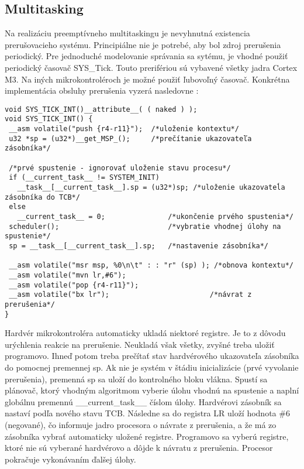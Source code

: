 \subsection{Multitasking}

Na realizáciu preemptívneho multitaskingu je nevyhnutná existencia prerušovacieho systému. Principiálne nie je potrebé, aby bol zdroj prerušenia periodický. Pre jednoduché modelovanie správania sa sytému, je vhodné použiť periodický časovač SYS\_Tick. Touto prerifériou sú vybavené všetky jadra Cortex M3. Na iných mikrokontroléroch je možné použiť ľubovoľný časovač. Konkrétna implementácia obsluhy prerušenia vyzerá nasledovne :

{\small
\begin{verbatim}
void SYS_TICK_INT()__attribute__( ( naked ) ); 
void SYS_TICK_INT() {
 __asm volatile("push {r4-r11}");  /*uloženie kontextu*/
 u32 *sp = (u32*)__get_MSP_();     /*prečítanie ukazovateľa zásobníka*/

 /*prvé spustenie - ignorovať uloženie stavu procesu*/
 if (__current_task__ != SYSTEM_INIT)  
   __task__[__current_task__].sp = (u32*)sp; /*uloženie ukazovateĺa zásobníka do TCB*/
 else
   __current_task__ = 0;               /*ukončenie prvého spustenia*/
 scheduler();                          /*vybratie vhodnej úlohy na spustenie*/
 sp = __task__[__current_task__].sp;   /*nastavenie zásobníka*/

 __asm volatile("msr msp, %0\n\t" : : "r" (sp) ); /*obnova kontextu*/
 __asm volatile("mvn lr,#6");
 __asm volatile("pop {r4-r11}");
 __asm volatile("bx lr");                        /*návrat z prerušenia*/
}
\end{verbatim}
}

Hardvér mikrokontroléra automaticky ukladá niektoré registre. Je to z dôvodu urýchlenia reakcie na prerušenie. Neukladá však všetky, zvyšné treba uložiť programovo. Ihneď potom treba prečítať stav hardvérového ukazovateľa zásobníka do pomocnej premennej sp. Ak nie je systém v štádiu inicializácie (prvé vyvolanie prerušenia), premenná sp sa uloží do kontrolného bloku vlákna. Spustí sa plánovač, ktorý vhodným algoritmom vyberie úlohu vhodnú na spustenie a naplní globálnu premennú \_\_current\_task\_\_ číslom úlohy.
Hardvérovi zásobník sa nastaví podľa nového stavu TCB. Následne sa do registra LR uloží hodnota \#6 (negované), čo informuje jadro procesora o návrate z prerušenia, a že má zo zásobníka vybrať automaticky uložené registre. Programovo sa vyberú registre, ktoré nie sú vyberané hardvérovo a dôjde k návratu z prerušenia. Procesor pokračuje vykonávaním ďalšej úlohy.



